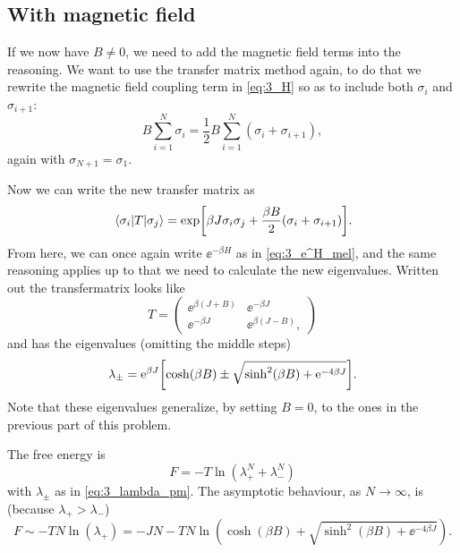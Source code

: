 \documentclass[11pt,letter, swedish, english
]{article}
\begin{document}
\subsection{With magnetic field}
If we now have $B\neq0$, we need to add the magnetic field terms into
the reasoning. We want to use the transfer matrix method again, to do
that we rewrite the magnetic field coupling term in \eqref{eq:3_H} so
as to include both $\sigma_i$ and $\sigma_{i+1}$:
\begin{equation}
B\sum_{i=1}^N\sigma_i=\frac{1}{2}B\sum_{i=1}^N(\sigma_i+\sigma_{i+1}),
\end{equation}
again with $\sigma_{N+1}=\sigma_1$. 

Now we can write the new transfer matrix as
\begin{equation}
\mel{\sigma_i}{T}{\sigma_j}
=\exp[\beta J\sigma_i\sigma_j+\frac{\beta B}{2}(\sigma_i+\sigma_{i+1})].
\end{equation}
From here, we can once again write $\ee^{-\beta H}$ as in
\eqref{eq:3_e^H_mel}, and the same reasoning applies up to that we
need to calculate the new eigenvalues. Written out the transfermatrix
looks like
\begin{equation}
T=\begin{pmatrix}
\ee^{\beta (J+B)} &\ee^{-\beta J}\\
\ee^{-\beta J} & \ee^{\beta (J-B)},
\end{pmatrix}
\end{equation}
and has the eigenvalues (omitting the middle steps)
\begin{equation}\label{eq:3_lambda_pm}
\lambda_\pm=\mathrm{e}^{\beta J}
\qty[\cosh(\beta B)\pm\sqrt{\sinh^2(\beta B)+\mathrm{e}^{-4\beta J}}].
\end{equation}
Note that these eigenvalues generalize, by setting $B=0$, to the ones
in the previous part of this problem. 

The free energy is
\begin{equation}
F=-T\ln(\lambda_+^N+\lambda_-^N)
\end{equation}
with $\lambda_\pm$ as in \eqref{eq:3_lambda_pm}. The asymptotic
behaviour, as $N\to\infty$, is (because $\lambda_+>\lambda_-$)
\begin{equation}
F\sim-TN\ln(\lambda_+)
=-JN -TN\ln(\cosh(\beta B)+\sqrt{\sinh^2(\beta B)+\ee^{-4\beta J}}).
\end{equation}
\end{document}
